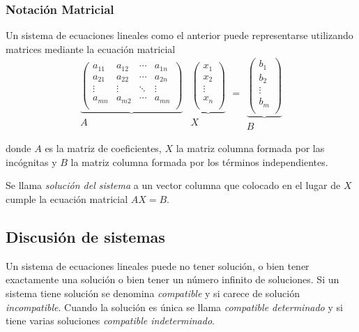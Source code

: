 \documentclass[a4paper]{article}
\begin{document}
\subsubsection*{Notación Matricial}
Un sistema de ecuaciones lineales como el anterior puede representarse utilizando matrices mediante la ecuación matricial
\[\begin{array}{c}
\underbrace{\left(
\begin{array}{cccc}
 a_{11} & a_{12} & \cdots & a_{1n} \\
 a_{21} & a_{22} & \cdots & a_{2n} \\
 \vdots & \vdots & \ddots & \vdots \\
 a_{mn} & a_{m2} & \cdots & a_{mn} \\
\end{array}
\right)}\\
A
\end{array}
\begin{array}{c}
\underbrace{\left(
\begin{array}{c}
  x_1   \\
  x_2   \\
 \vdots \\
  x_ n  \\
\end{array}
\right)}\\
X
\end{array}
=
\begin{array}{c}
\underbrace{\left(
\begin{array}{c}
  b_1   \\
  b_2   \\
 \vdots \\
  b_m   \\
\end{array}
\right)}\\
B
\end{array}
\]

donde $A$ es la matriz de coeficientes, $X$ la matriz columna formada por las incógnitas y $B$ la matriz columna formada por los términos independientes.

Se llama \emph{solución del sistema} a un vector columna que colocado en el lugar de $X$ cumple la ecuación matricial $AX=B$.



\subsection*{Discusión de sistemas}
Un sistema de ecuaciones lineales puede no tener solución, o bien tener exactamente una solución o bien tener un número infinito de soluciones. Si un sistema tiene solución se denomina \emph{compatible} y si carece de solución \emph{incompatible}. Cuando la solución es única se llama \emph{compatible determinado} y si tiene varias soluciones \emph{compatible indeterminado}.
\end{document}

